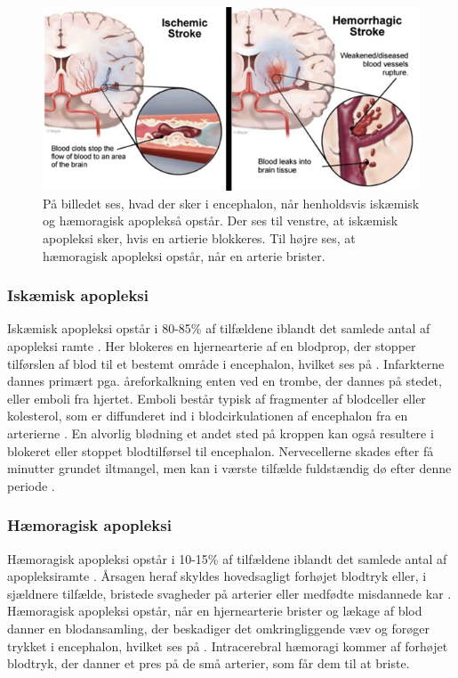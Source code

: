 \begin{figure}[H]
	\centering
	\includegraphics[scale=0.8]{figures/bProblemanalyse/haemoragisk_og_iskaemisk.png}
	\caption{På billedet ses, hvad der sker i encephalon, når henholdsvis iskæmisk og hæmoragisk apoplekså opstår. Der ses til venstre, at iskæmisk apopleksi sker, hvis en artierie blokkeres. Til højre ses, at hæmoragisk apopleksi opstår, når en arterie brister.\cite{Ritter2015}}
	\label{haem-isk}
\end{figure}

\subsubsection{Iskæmisk apopleksi}
Iskæmisk apopleksi opstår i 80-85\% af tilfældene iblandt det samlede antal af apopleksi ramte \cite{Sundhed.dk2014}. Her blokeres en hjernearterie af en blodprop, der stopper tilførslen af blod til et bestemt område i encephalon, hvilket ses på . Infarkterne dannes primært pga. åreforkalkning enten ved en trombe, der dannes på stedet, eller emboli fra hjertet. \cite{Schulze2011} Emboli består typisk af fragmenter af blodceller eller kolesterol, som er diffunderet ind i blodcirkulationen af encephalon fra en arterierne \cite{Academic2015a}. En alvorlig blødning et andet sted på kroppen kan også resultere i blokeret eller stoppet blodtilførsel til encephalon. \cite{Hjernesagen2015a} Nervecellerne skades efter få minutter grundet iltmangel, men kan i værste tilfælde fuldstændig dø efter denne periode \cite{Schulze2011,Giraldo2015}.%

\subsubsection{Hæmoragisk apopleksi}
Hæmoragisk apopleksi opstår i 10-15\% af tilfældene iblandt det samlede antal af apopleksiramte \cite{Sundhed.dk2014}. Årsagen heraf skyldes hovedsagligt forhøjet blodtryk eller, i sjældnere tilfælde, bristede svagheder på arterier eller medfødte misdannede kar \cite{Schulze2011}. Hæmoragisk apopleksi opstår, når en hjernearterie brister og lækage af blod danner en blodansamling, der beskadiger det omkringliggende væv og forøger trykket i encephalon, hvilket ses på . Intracerebral hæmoragi kommer af forhøjet blodtryk, der danner et pres på de små arterier, som får dem til at briste. \cite{Caplan2006}

